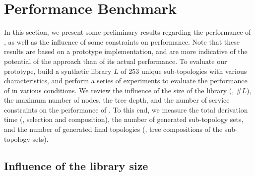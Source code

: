 \section{Performance Benchmark\label{sec:topologies.benchmark}}


In this section, we present some preliminary results regarding the performance of \thecontrib, as well as the influence of some constraints on performance.
Note that these results are based on a prototype implementation, and are more indicative of the potential of the approach than of its actual performance.
To evaluate our prototype, build a synthetic library $L$ of 253 unique sub-topologies with various characteristics, and perform a series of experiments to evaluate the performance of \thecontrib in various conditions.
We review the influence of the size of the library (\ie, $\#L$), the maximum number of nodes, the tree depth, and the number of service constraints on the performance of \thecontrib.
To this end, we measure the total derivation time (\ie, selection and composition), the number of generated sub-topology sets, and the number of generated final topologies (\ie, tree compositions of the sub-topology sets).


\subsection{Influence of the library size\label{sec:topologies.benchmark.library}}

